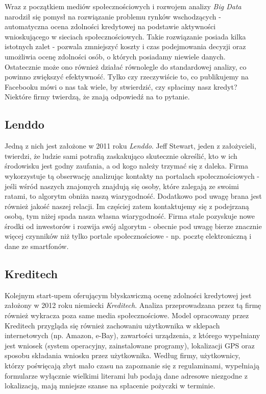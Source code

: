 \documentclass[polish]{kbk}
\begin{document}
Wraz z początkiem mediów społecznościowych i rozwojem analizy \textit{Big Data} narodził się pomysł na rozwiązanie problemu rynków wschodzących - automatyczna ocena zdolności kredytowej na podstawie aktywności wnioskującego w sieciach społecznościowych. Takie rozwiązanie posiada kilka istotnych zalet - pozwala zmniejszyć koszty i czas podejmowania decyzji oraz umożliwia ocenę zdolności osób, o których posiadamy niewiele danych. Ostatecznie może ono również działać równolegle do standardowej analizy, co powinno zwiększyć efektywność. Tylko czy rzeczywiście to, co publikujemy na Facebooku mówi o nas tak wiele, by stwierdzić, czy spłacimy nasz kredyt? Niektóre firmy twierdzą, że znają odpowiedź na to pytanie.

\subsection{Lenddo \cite{cnn-tech, lenddo}}
Jedną z nich jest założone w 2011 roku \textit{Lenddo}. Jeff Stewart, jeden z założycieli, twierdzi, że ludzie sami potrafią zaskakująco skutecznie określić, kto w ich środowisku jest godny zaufania, a od kogo należy trzymać się z daleka. Firma wykorzystuje tą obserwację analizując kontakty na portalach społecznościowych - jeśli wśród naszych znajomych znajdują się osoby, które zalegają ze swoimi ratami, to algorytm obniża naszą wiarygodność. Dodatkowo pod uwagę brana jest również jakość naszej relacji. Im częściej zatem kontaktujemy się z podejrzaną osobą, tym niżej spada nasza własna wiarygodność. Firma stale pozyskuje nowe środki od inwestorów i rozwija swój algorytm - obecnie pod uwagę bierze znacznie więcej czynników niż tylko portale społecznościowe - np. pocztę elektroniczną i dane ze smartfonów.

\subsection{Kreditech \cite{cnn-tech, slate}}
Kolejnym start-upem oferującym błyskawiczną ocenę zdolności kredytowej jest założony w 2012 roku niemiecki \textit{Kreditech}. Analiza przeprowadzana przez tą firmę również wykracza poza same media społecznościowe. Model opracowany przez Kreditech przygląda się również zachowaniu użytkownika w sklepach internetowych (np. Amazon, e-Bay), zawartości urządzenia, z którego wypełniany jest wniosek (system operacyjny, zainstalowane programy), lokalizacji GPS oraz sposobu składania wniosku przez użytkownika. Według firmy, użytkownicy, którzy poświęcają zbyt mało czasu na zapoznanie się z regulaminami, wypełniają formularze wyłącznie wielkimi literami lub podają dane adresowe niezgodne z lokalizacją, mają mniejsze szanse na spłacenie pożyczki w terminie.
\end{document}
